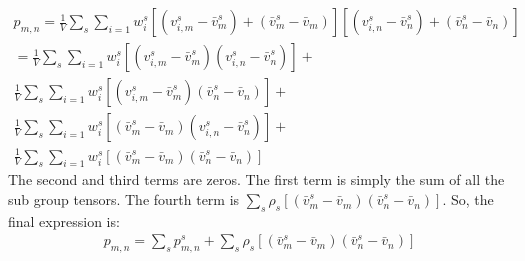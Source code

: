 \documentclass[a4paper, 11pt]{article}
\begin{document}
\begin{eqnarray}
    p_{m,n} = \frac{1}{V} \sum_{s}\sum_{i=1} w_i^s [(v_{i,m}^s- \bar{v}_m^s) + (\bar{v}_m^s -\bar{v}_m)] [(v_{i,n}^s- \bar{v}_n^s) + (\bar{v}_n^s  - \bar{v}_n)]\\
    = \frac{1}{V} \sum_{s}\sum_{i=1} w_i^s[(v_{i,m}^s- \bar{v}_m^s)(v_{i,n}^s- \bar{v}_n^s)] + \\ \frac{1}{V} \sum_{s}\sum_{i=1} w_i^s[(v_{i,m}^s- \bar{v}_m^s)(\bar{v}_n^s - \bar{v}_n)] + \\
    \frac{1}{V} \sum_{s}\sum_{i=1} w_i^s[(\bar{v}_m^s -\bar{v}_m)(v_{i,n}^s- \bar{v}_n^s)] + \\ \frac{1}{V} \sum_{s}\sum_{i=1} w_i^s[(\bar{v}_m^s -\bar{v}_m)(\bar{v}_n^s - \bar{v}_n)]
\end{eqnarray}
The second and third terms are zeros. The first term is simply the sum of all the sub group tensors. The fourth term is $\sum_s \rho_s [(\bar{v}_m^s -\bar{v}_m)(\bar{v}_n^s - \bar{v}_n)]$. So, the final expression is:
\begin{eqnarray}
    p_{m,n} = \sum_s p^s_{m,n} + \sum_s \rho_s [(\bar{v}_m^s -\bar{v}_m)(\bar{v}_n^s - \bar{v}_n)]
\end{eqnarray}
\end{document}
